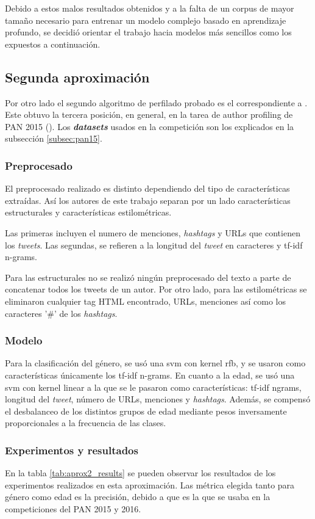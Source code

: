  Debido a estos malos resultados obtenidos y a la falta de un corpus de mayor tamaño necesario para entrenar un modelo complejo basado en aprendizaje profundo, se decidió orientar el trabajo hacia modelos más sencillos como los expuestos a continuación.



\subsection{Segunda aproximación}
Por otro lado el segundo algoritmo de perfilado probado es el correspondiente a \cite{grivas2015author}. Este obtuvo la tercera posición, en general, en la tarea de author profiling de PAN 2015 (\cite{pan:2015}).
Los \textit{\textbf{datasets}} usados en la competición son los explicados en la subsección \ref{subsec:pan15}.
\subsubsection{Preprocesado}
El preprocesado realizado es distinto dependiendo del tipo de características extraídas. Así los autores de este trabajo separan por un lado características estructurales y características estilométricas.

Las primeras incluyen el numero de menciones, \textit{hashtags} y URLs que contienen los \textit{tweets}. Las segundas, se refieren a la longitud del \textit{tweet} en caracteres y tf-idf n-grams.

Para las estructurales no se realizó ningún preprocesado del texto a parte de concatenar todos los tweets de un autor. Por otro lado, para las estilométricas se eliminaron cualquier tag HTML encontrado, URLs, menciones así como los caracteres '\#' de los \textit{hashtags}.

\subsubsection{Modelo}
Para la clasificación del género, se usó una \gls{svm} con kernel rfb, y se usaron como características únicamente los tf-idf n-grams. En cuanto a la edad, se usó una \gls{svm} con kernel linear a la que se le pasaron como características: tf-idf ngrams, longitud del \textit{tweet}, número de URLs, menciones y \textit{hashtags}. Además, se compensó el desbalanceo de los distintos grupos de edad mediante pesos inversamente proporcionales a la frecuencia de las clases.

\subsubsection{Experimentos y resultados}
En la tabla \ref{tab:aprox2_results} se pueden observar los resultados de los experimentos realizados en esta aproximación. Las métrica elegida tanto para género como edad es la precisión, debido a que es la que se usaba en la competiciones del PAN 2015 y 2016.

